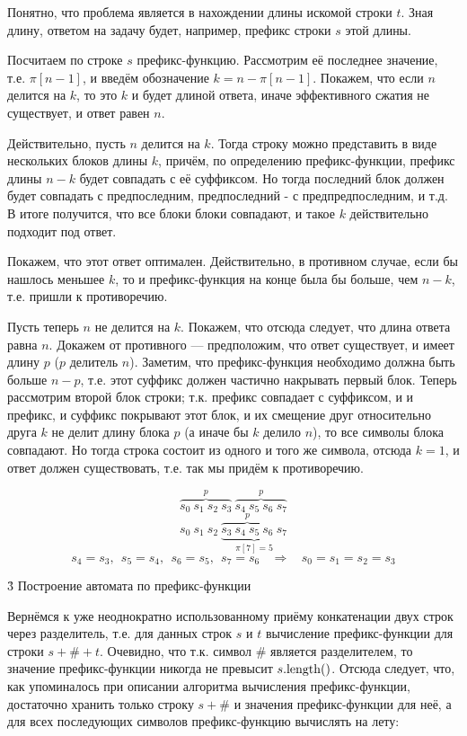 Понятно, что проблема является в нахождении длины искомой строки $t$. Зная длину, ответом на задачу будет, например, префикс строки $s$ этой длины.

Посчитаем по строке $s$ префикс-функцию. Рассмотрим её последнее значение, т.е. $\pi[n-1]$, и введём обозначение $k = n - \pi[n-1]$. Покажем, что если $n$ делится на $k$, то это $k$ и будет длиной ответа, иначе эффективного сжатия не существует, и ответ равен $n$.

Действительно, пусть $n$ делится на $k$. Тогда строку можно представить в виде нескольких блоков длины $k$, причём, по определению префикс-функции, префикс длины $n-k$ будет совпадать с её суффиксом. Но тогда последний блок должен будет совпадать с предпоследним, предпоследний - с предпредпоследним, и т.д. В итоге получится, что все блоки блоки совпадают, и такое $k$ действительно подходит под ответ.

Покажем, что этот ответ оптимален. Действительно, в противном случае, если бы нашлось меньшее $k$, то и префикс-функция на конце была бы больше, чем $n-k$, т.е. пришли к противоречию.

Пусть теперь $n$ не делится на $k$. Покажем, что отсюда следует, что длина ответа равна $n$. Докажем от противного --- предположим, что ответ существует, и имеет длину $p$ ($p$ делитель $n$). Заметим, что префикс-функция необходимо должна быть больше $n - p$, т.е. этот суффикс должен частично накрывать первый блок. Теперь рассмотрим второй блок строки; т.к. префикс совпадает с суффиксом, и и префикс, и суффикс покрывают этот блок, и их смещение друг относительно друга $k$ не делит длину блока $p$ (а иначе бы $k$ делило $n$), то все символы блока совпадают. Но тогда строка состоит из одного и того же символа, отсюда $k=1$, и ответ должен существовать, т.е. так мы придём к противоречию.

$$ \overbrace{s_0\ s_1\ s_2\ s_3}^{p}\ \overbrace{s_4\ s_5\ s_6\ s_7}^{p} $$
$$ s_0\ s_1\ s_2\ \underbrace{\overbrace{s_3\ s_4\ s_5\ s_6}^{p}\ s_7}_{\pi[7]=5} $$
$$ s_4=s_3,\ \ s_5=s_4,\ \ s_6=s_5,\ \ s_7=s_6\ \ \ \ \Longrightarrow\ \ \ \ s_0=s_1=s_2=s_3 $$


\h3{ Построение автомата по префикс-функции }

Вернёмся к уже неоднократно использованному приёму конкатенации двух строк через разделитель, т.е. для данных строк $s$ и $t$ вычисление префикс-функции для строки $s+\#+t$. Очевидно, что т.к. символ $\#$ является разделителем, то значение префикс-функции никогда не превысит $s.{\rm length}()$. Отсюда следует, что, как упоминалось при описании алгоритма вычисления префикс-функции, достаточно хранить только строку $s+\#$ и значения префикс-функции для неё, а для всех последующих символов префикс-функцию вычислять на лету:

